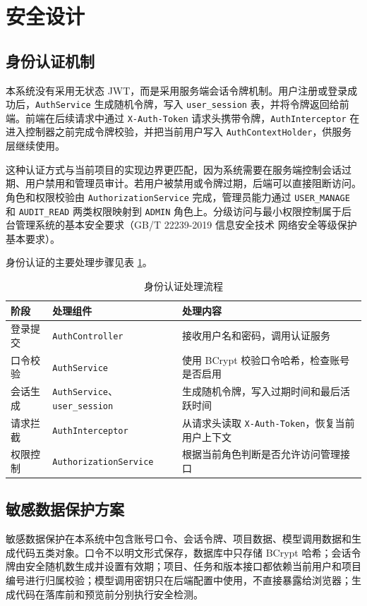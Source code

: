 \section{安全设计}
\subsection{身份认证机制}
本系统没有采用无状态 JWT，而是采用服务端会话令牌机制。用户注册或登录成功后，\texttt{AuthService} 生成随机令牌，写入 \texttt{user\_session} 表，并将令牌返回给前端。前端在后续请求中通过 \texttt{X-Auth-Token} 请求头携带令牌，\texttt{AuthInterceptor} 在进入控制器之前完成令牌校验，并把当前用户写入 \texttt{AuthContextHolder}，供服务层继续使用。

这种认证方式与当前项目的实现边界更匹配，因为系统需要在服务端控制会话过期、用户禁用和管理员审计。若用户被禁用或令牌过期，后端可以直接阻断访问。角色和权限校验由 \texttt{AuthorizationService} 完成，管理员能力通过 \texttt{USER\_MANAGE} 和 \texttt{AUDIT\_READ} 两类权限映射到 \texttt{ADMIN} 角色上。分级访问与最小权限控制属于后台管理系统的基本安全要求（GB/T 22239-2019 信息安全技术 网络安全等级保护基本要求）\cite{gbt22239_2019}。

身份认证的主要处理步骤见表 \ref{tab:chapter4-auth-flow}。

\begin{table}[!htbp]
\centering
\caption{身份认证处理流程}
\label{tab:chapter4-auth-flow}
\small
\begin{tabular}{@{}p{}p{}p{}@{}}
\toprule
阶段 & 处理组件 & 处理内容 \\
\midrule
登录提交 & \texttt{AuthController} & 接收用户名和密码，调用认证服务 \\
口令校验 & \texttt{AuthService} & 使用 BCrypt 校验口令哈希，检查账号是否启用 \\
会话生成 & \texttt{AuthService}、\texttt{user\_session} & 生成随机令牌，写入过期时间和最后活跃时间 \\
请求拦截 & \texttt{AuthInterceptor} & 从请求头读取 \texttt{X-Auth-Token}，恢复当前用户上下文 \\
权限控制 & \texttt{AuthorizationService} & 根据当前角色判断是否允许访问管理接口 \\
\bottomrule
\end{tabular}
\end{table}

\subsection{敏感数据保护方案}
敏感数据保护在本系统中包含账号口令、会话令牌、项目数据、模型调用数据和生成代码五类对象。口令不以明文形式保存，数据库中只存储 BCrypt 哈希；会话令牌由安全随机数生成并设置有效期；项目、任务和版本接口都依赖当前用户和项目编号进行归属校验；模型调用密钥只在后端配置中使用，不直接暴露给浏览器；生成代码在落库前和预览前分别执行安全检测。

